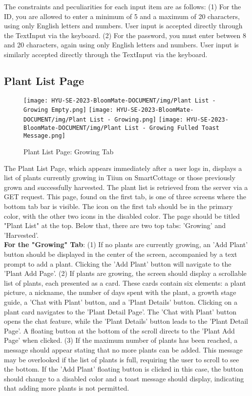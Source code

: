 \documentclass[conference, a4paper]{IEEEtran}
\begin{document}
The constraints and peculiarities for each input item are as follows: (1) For the ID, you are allowed to enter a minimum of 5 and a maximum of 20 characters, using only English letters and numbers. User input is accepted directly through the TextInput via the keyboard. (2) For the password, you must enter between 8 and 20 characters, again using only English letters and numbers. User input is similarly accepted directly through the TextInput via the keyboard.

\subsection{Plant List Page}
    \begin{figure}[h]
    \centerline{
        \texttt{[image: HYU-SE-2023-BloomMate-DOCUMENT/img/Plant List - Growing Empty.png]}
        \texttt{[image: HYU-SE-2023-BloomMate-DOCUMENT/img/Plant List - Growing.png]}
        \texttt{[image: HYU-SE-2023-BloomMate-DOCUMENT/img/Plant List - Growing Fulled Toast Message.png]}
    }
    \label{fig}
    \caption{Plant List Page: Growing Tab}
    \end{figure}

The Plant List Page, which appears immediately after a user logs in, displays a list of plants currently growing in Tiiun on SmartCottage or those previously grown and successfully harvested. The plant list is retrieved from the server via a GET request. This page, found on the first tab, is one of three screens where the bottom tab bar is visible. The icon on the first tab should be in the primary color, with the other two icons in the disabled color. The page should be titled "Plant List" at the top. Below that, there are two top tabs: 'Growing' and 'Harvested'.\\

\textbf{For the "Growing" Tab}: (1) If no plants are currently growing, an 'Add Plant' button should be displayed in the center of the screen, accompanied by a text prompt to add a plant. Clicking the 'Add Plant' button will navigate to the 'Plant Add Page'. (2) If plants are growing, the screen should display a scrollable list of plants, each presented as a card. These cards contain six elements: a plant picture, a nickname, the number of days spent with the plant, a growth stage guide, a 'Chat with Plant' button, and a 'Plant Details' button. Clicking on a plant card navigates to the 'Plant Detail Page'. The 'Chat with Plant' button opens the chat feature, while the 'Plant Details' button leads to the 'Plant Detail Page'. A floating button at the bottom of the scroll directs to the 'Plant Add Page' when clicked. (3) If the maximum number of plants has been reached, a message should appear stating that no more plants can be added. This message may be overlooked if the list of plants is full, requiring the user to scroll to see the bottom. If the 'Add Plant' floating button is clicked in this case, the button should change to a disabled color and a toast message should display, indicating that adding more plants is not permitted.\\
    
\end{document}

